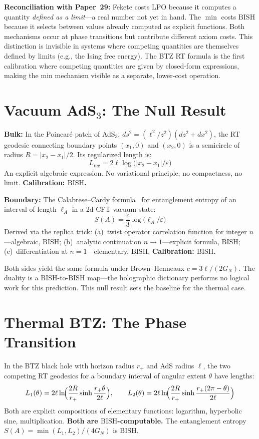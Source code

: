 \documentclass[11pt,a4paper]{report}
\theoremstyle{plain}
\theoremstyle{definition}
\theoremstyle{remark}
\newcommand{\BISH}{\mathrm{BISH}}
\newcommand{\LPO}{\mathrm{LPO}}
\begin{document}
\textbf{Reconciliation with Paper~29:} Fekete costs $\LPO$ because it computes a quantity \emph{defined as a limit}---a real number not yet in hand. The $\min$ costs $\BISH$ because it selects between values already computed as explicit functions. Both mechanisms occur at phase transitions but contribute different axiom costs. This distinction is invisible in systems where competing quantities are themselves defined by limits (e.g., the Ising free energy). The BTZ RT formula is the first calibration where competing quantities are given by closed-form expressions, making the min mechanism visible as a separate, lower-cost operation.

\section{Vacuum AdS$_3$: The Null Result}

\textbf{Bulk:} In the Poincar\'e patch of AdS$_3$, $ds^2 = (\ell^2/z^2)(dz^2 + dx^2)$, the RT geodesic connecting boundary points $(x_1,0)$ and $(x_2,0)$ is a semicircle of radius $R = |x_2-x_1|/2$. Its regularized length is:
\[
  L_{\mathrm{reg}} = 2\ell\log\!\bigl(|x_2-x_1|/\varepsilon\bigr)
\]
An explicit algebraic expression. No variational principle, no compactness, no limit. \textbf{Calibration: $\BISH$.}

\textbf{Boundary:} The Calabrese--Cardy formula~\cite{CalabreseCardy2004} for entanglement entropy of an interval of length $\ell_A$ in a 2d CFT vacuum state:
\[
  S(A) = \frac{c}{3}\log\!\bigl(\ell_A/\varepsilon\bigr)
\]
Derived via the replica trick: (a)~twist operator correlation function for integer $n$---algebraic, $\BISH$; (b)~analytic continuation $n \to 1$---explicit formula, $\BISH$; (c)~differentiation at $n=1$---elementary, $\BISH$. \textbf{Calibration: $\BISH$.}

Both sides yield the same formula under Brown--Henneaux $c = 3\ell/(2G_N)$. The duality is a $\BISH$-to-$\BISH$ map---the holographic dictionary performs no logical work for this prediction. This null result sets the baseline for the thermal case.

\section{Thermal BTZ: The Phase Transition}

In the BTZ black hole with horizon radius $r_+$ and AdS radius $\ell$, the two competing RT geodesics for a boundary interval of angular extent $\theta$ have lengths:
\[
  L_1(\theta) = 2\ell\ln\!\Bigl(\frac{2R}{r_+}\sinh\frac{r_+\theta}{2\ell}\Bigr), \qquad
  L_2(\theta) = 2\ell\ln\!\Bigl(\frac{2R}{r_+}\sinh\frac{r_+(2\pi-\theta)}{2\ell}\Bigr)
\]
Both are explicit compositions of elementary functions: logarithm, hyperbolic sine, multiplication. \textbf{Both are $\BISH$-computable.} The entanglement entropy $S(A) = \min(L_1,L_2)/(4G_N)$ is $\BISH$.
\end{document}

